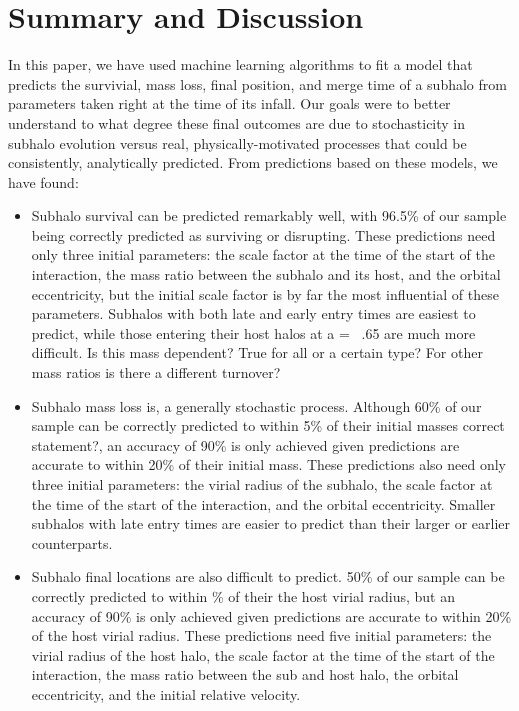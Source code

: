 \documentclass[fleqn,usenatbib]{mnras}
\newcommand\edits[1]{{\color{red}#1}}
\begin{document}
{\section{Summary and Discussion}
\label{sec:Conclusion}
In this paper, we have used machine learning algorithms to fit a model that predicts the survivial, mass loss, final position, and merge time of a subhalo from parameters taken right at the time of its infall. Our goals were to better understand to what degree these final outcomes are due to stochasticity in subhalo evolution versus real, physically-motivated processes that could be consistently, analytically predicted. From predictions based on these models, we have found:
\begin{itemize}
    \item Subhalo survival can be predicted remarkably well, with 96.5\% of our sample being correctly predicted as surviving or disrupting. These predictions need only three initial parameters: the scale factor at the time of the start of the interaction, the mass ratio between the subhalo and its host, and the orbital eccentricity, but the initial scale factor is by far the most influential of these parameters. Subhalos with both late and early entry times are easiest to predict, while those entering their host halos at a = ~.65 are much more difficult. \edits{Is this mass dependent? True for all or a certain type? For other mass ratios is there a different turnover?}
    \item Subhalo mass loss is, a generally stochastic process. Although 60\% of our sample can be correctly predicted to \edits{within 5\% of their initial masses correct statement?}, an accuracy of 90\% is only achieved given predictions are accurate to within 20\% of their initial mass. These predictions also need only three initial parameters: the virial radius of the subhalo, the scale factor at the time of the start of the interaction, and the orbital eccentricity. Smaller subhalos with late entry times are easier to predict than their larger or earlier counterparts.
    \item Subhalo final locations are also difficult to predict. 50\% of our sample can be correctly predicted to within \% of their the host virial radius, but an accuracy of 90\% is only achieved given predictions are accurate to within 20\% of the host virial radius. These predictions need five initial parameters: the virial radius of the host halo, the scale factor at the time of the start of the interaction, the mass ratio between the sub and host halo, the orbital eccentricity, and the initial relative velocity.

\end{itemize}}
\end{document}
